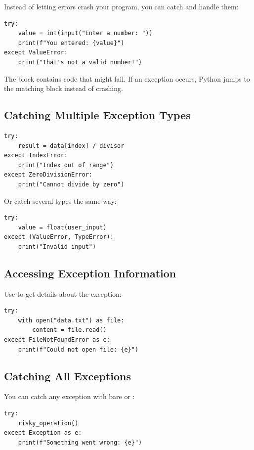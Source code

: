 Instead of letting errors crash your program, you can catch and handle them:

\begin{lstlisting}
try:
    value = int(input("Enter a number: "))
    print(f"You entered: {value}")
except ValueError:
    print("That's not a valid number!")
\end{lstlisting}

The  block contains code that might fail. If an exception occurs, Python jumps to the matching  block instead of crashing.

\subsection{Catching Multiple Exception Types}

\begin{lstlisting}
try:
    result = data[index] / divisor
except IndexError:
    print("Index out of range")
except ZeroDivisionError:
    print("Cannot divide by zero")
\end{lstlisting}

Or catch several types the same way:

\begin{lstlisting}
try:
    value = float(user_input)
except (ValueError, TypeError):
    print("Invalid input")
\end{lstlisting}

\subsection{Accessing Exception Information}

Use  to get details about the exception:

\begin{lstlisting}
try:
    with open("data.txt") as file:
        content = file.read()
except FileNotFoundError as e:
    print(f"Could not open file: {e}")
\end{lstlisting}

\subsection{Catching All Exceptions}

You can catch any exception with bare  or :

\begin{lstlisting}
try:
    risky_operation()
except Exception as e:
    print(f"Something went wrong: {e}")
\end{lstlisting}

